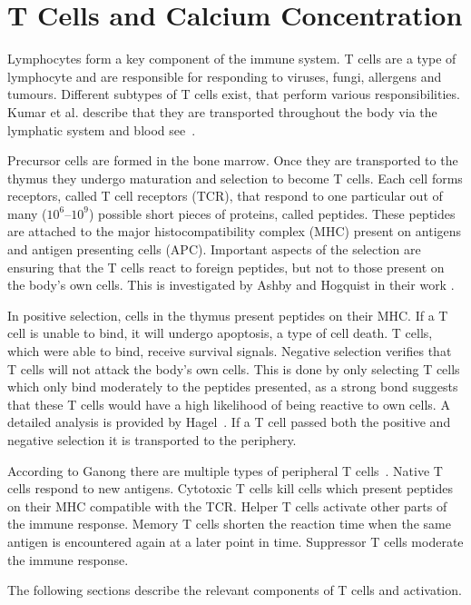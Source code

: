 \chapter{T Cells and Calcium Concentration}
\label{chapter:t-cell}

Lymphocytes form a key component of the immune system. T cells are a type of lymphocyte and are responsible for responding to viruses, fungi, allergens and tumours. Different subtypes of T cells exist, that perform various responsibilities. Kumar et al. describe that they are transported throughout the body via the lymphatic system and blood see~\cite{Kumar2018}.

Precursor cells are formed in the bone marrow. Once they are transported to the thymus they undergo maturation and selection to become T cells. Each cell forms receptors, called T cell receptors (TCR), that respond to one particular out of many ($10^6 – 10^9$) possible short pieces of proteins, called peptides. These peptides are attached to the major histocompatibility complex (MHC) present on antigens and antigen presenting cells (APC). Important aspects of the selection are ensuring that the T cells react to foreign peptides, but not to those present on the body's own cells. This is investigated by Ashby and Hogquist in their work \cite{Ashby2024}.

In positive selection, cells in the thymus present peptides on their MHC. If a T cell is unable to bind, it will undergo apoptosis, a type of cell death. T cells, which were able to bind, receive survival signals. Negative selection verifies that T cells will not attack the body's own cells. This is done by only selecting T cells which only bind moderately to the peptides presented, as a strong bond suggests that these T cells would have a high likelihood of being reactive to own cells. A detailed analysis is provided by Hagel~\cite{Hagel2018}. If a T cell passed both the positive and negative selection it is transported to the periphery.

According to Ganong there are multiple types of peripheral T cells~\cite{Ganong1997}. Native T cells respond to new antigens. Cytotoxic T cells kill cells which present peptides on their MHC compatible with the TCR. Helper T cells activate other parts of the immune response. Memory T cells shorten the reaction time when the same antigen is encountered again at a later point in time. Suppressor T cells moderate the immune response.

The following sections describe the relevant components of T cells and activation.


